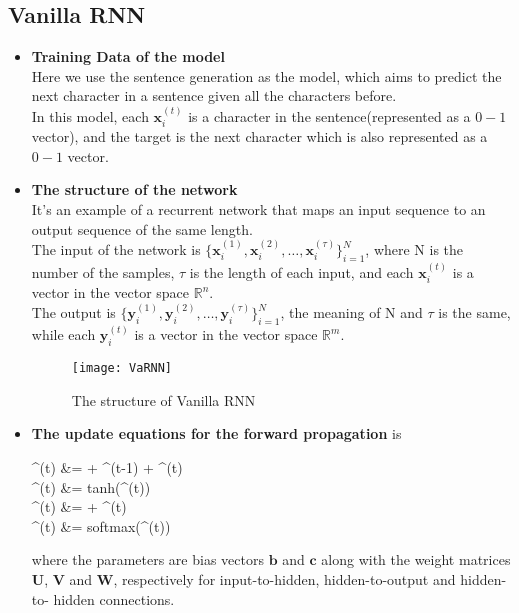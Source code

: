 	\subsection{Vanilla RNN}
	\begin{itemize}
		\item 
		\textbf{Training Data of the model} \\
		Here we use the sentence generation as the model, which aims to predict the next character in a sentence given all the characters before. \\
		 In this model, each $\mathbf{x}_i^{(t)}$ is a character in the sentence(represented as a $0-1$ vector), and the target is the next character which is also represented as a $0-1$ vector.
		\item
		\textbf{The structure of the network} \\
		It's an example of a recurrent network that maps an
		input sequence to an output sequence of the same length. \\
		The input of the network is $\{\mathbf{x}_i^{(1)},\mathbf{x}_i^{(2)},\dots,\mathbf{x}_i^{(\tau)}\}_{i=1}^N$, where N is the number of the samples, $\tau$ is the length of each input, and each $\mathbf{x}_i^{(t)}$ is a vector in the vector space $\mathbb{R}^n$. \\
		 The output is $\{\mathbf{y}_i^{(1)},\mathbf{y}_i^{(2)},\dots,\mathbf{y}_i^{(\tau)}\}_{i=1}^N$, the meaning of N and $\tau$ is the same, while each $\mathbf{y}_i^{(t)}$ is a vector in the vector space $\mathbb{R}^m$. \\
		\begin{figure}[H]
			\centering
			\texttt{[image: VaRNN]}
			\caption{The structure of Vanilla RNN}
		\end{figure}
		
		\item
		\textbf{The update equations for the forward propagation} is
		\begin{flalign*}
		^{(t)} &=  + ^{(t-1)} + ^{(t)} \\
		^{(t)} &= tanh(^{(t)}) \\
		^{(t)} &=  + ^{(t)} \\
		^{(t)} &= softmax(^{(t)})
		\end{flalign*}
		where the parameters are bias vectors $\mathbf{b}$ and $\mathbf{c}$ along with the weight matrices
		$\mathbf{U}$, $\mathbf{V}$ and $\mathbf{W}$, respectively for input-to-hidden, hidden-to-output and hidden-to- hidden connections.


\end{itemize}
